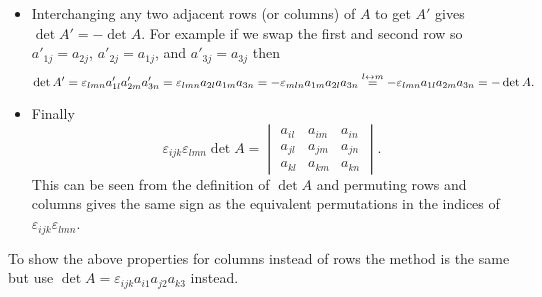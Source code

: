 \begin{itemize}
    \item Interchanging any two adjacent rows (or columns) of \(A\) to get \(A'\) gives \(\det A' = -\det A\).
    For example if we swap the first and second row so \(a'_{1j} = a_{2j}\), \(a'_{2j} = a_{1j}\), and \(a'_{3j} = a_{3j}\) then
    \[\det A' = \varepsilon_{lmn}a'_{1l}a'_{2m}a'_{3n} = \varepsilon_{lmn}a_{2l}a_{1m}a_{3n} = -\varepsilon_{mln}a_{1m}a_{2l}a_{3n} \overset{{l} \leftrightarrow {m}}{=} -\varepsilon_{lmn}a_{1l}a_{2m}a_{3n} = -\det A.\]
    \item Finally
    \begin{equation}\label{eqn:epsilon epsilon det A}
        \varepsilon_{ijk}\varepsilon_{lmn}\det A = 
        \begin{vmatrix}
            a_{il} & a_{im} & a_{in}\\
            a_{jl} & a_{jm} & a_{jn}\\
            a_{kl} & a_{km} & a_{kn}
        \end{vmatrix}
        .
    \end{equation}
    This can be seen from the definition of \(\det A\) and permuting rows and columns gives the same sign as the equivalent permutations in the indices of \(\varepsilon_{ijk}\varepsilon_{lmn}\).
\end{itemize}
To show the above properties for columns instead of rows the method is the same but use \(\det A = \varepsilon_{ijk}a_{i1}a_{j2}a_{k3}\) instead.

